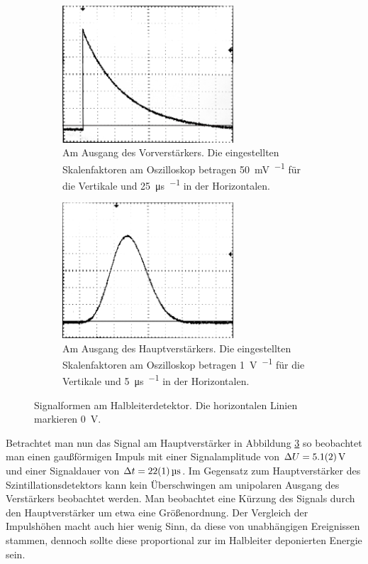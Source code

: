 \documentclass[11pt, a4paper]{article}
\numberwithin{equation}{section}
\begin{document}
\begin{figure}[h]
	\centering
	\begin{subfigure}[b]{0.7\textwidth}
		\centering
		\includegraphics[width=0.7\textwidth]{./figures/signale/vor_ger_abgeschnitten.jpg}
		\caption{Am Ausgang des Vorverstärkers. Die eingestellten Skalenfaktoren am Oszilloskop betragen \SI{50}{\milli\volt\per\division} für die Vertikale und \SI{25}{\micro\second\per\division} in der Horizontalen.}
		\label{fig:signal_ger_vor}
	\end{subfigure}
	
	\begin{subfigure}[b]{0.7\textwidth}
		\centering
		\includegraphics[width=0.7\textwidth]{./figures/signale/haupt_ger_abgeschnitten.jpg}
		\caption{Am Ausgang des Hauptverstärkers. Die eingestellten Skalenfaktoren am Oszilloskop betragen \SI{1}{\volt\per\division} für die Vertikale und \SI{5}{\micro\second\per\division} in der Horizontalen.}
		\label{fig:signal_ger_haupt}
	\end{subfigure}
	\caption{Signalformen am Halbleiterdetektor. Die horizontalen Linien markieren \SI{0}{\volt}.}
\end{figure}
Betrachtet man nun das Signal am Hauptverstärker in Abbildung \ref{fig:signal_ger_haupt} so beobachtet man einen gaußförmigen Impuls mit einer Signalamplitude von $\Delta U = \SI{5.1 +- 0.2}{\volt}$ und einer Signaldauer von $\Delta t = \SI{22 +- 1}{\micro\second}$.
Im Gegensatz zum Hauptverstärker des Szintillationsdetektors kann kein Überschwingen am unipolaren Ausgang des Verstärkers beobachtet werden.
Man beobachtet eine Kürzung des Signals durch den Hauptverstärker um etwa eine Größenordnung.
Der Vergleich der Impulshöhen macht auch hier wenig Sinn, da diese von unabhängigen Ereignissen stammen, dennoch sollte diese proportional zur im Halbleiter deponierten Energie sein.
\end{document}
